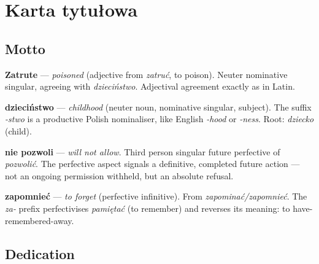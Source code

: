 
\chapter*{Karta tytułowa}

\section{Motto}


\textbf{Zatrute} — \textit{poisoned} (adjective from \textit{zatruć}, to poison). 
Neuter nominative singular, agreeing with \textit{dzieciństwo}. 
Adjectival agreement exactly as in Latin.

\textbf{dzieciństwo} — \textit{childhood} (neuter noun, nominative singular, subject). 
The suffix \textit{-stwo} is a productive Polish nominaliser, like English 
\textit{-hood} or \textit{-ness}. Root: \textit{dziecko} (child).

\textbf{nie pozwoli} — \textit{will not allow}. Third person singular future 
perfective of \textit{pozwolić}. The perfective aspect signals a definitive, 
completed future action — not an ongoing permission withheld, but an absolute refusal.

\textbf{zapomnieć} — \textit{to forget} (perfective infinitive). 
From \textit{zapominać/zapomnieć}. The \textit{za-} prefix perfectivises 
\textit{pamiętać} (to remember) and reverses its meaning: to have-remembered-away.


\section{Dedication}

